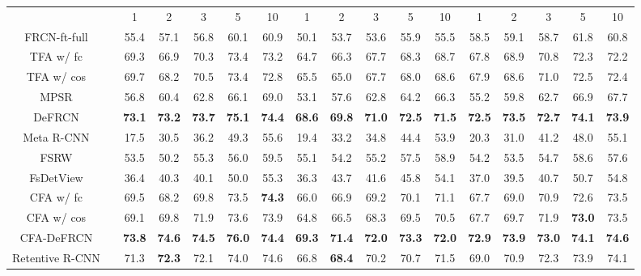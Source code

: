 \documentclass[10pt,twocolumn,letterpaper]{article}
\newcommand{\cmark}{\ding{51}}\newcommand{\xmark}{\ding{55}}\newcommand\minisection[1]{\vspace{1mm}\noindent \textbf{#1}}
\newcommand{\best}[1]{\color{red}\textbf{#1}}
\newcommand{\second}[1]{\color{blue}\textbf{#1}}
\begin{document}
\begin{table*}
\begin{tabular}{c| c | c c c c c | c c c c c | c c c c c}
      & & 1 &  {2} & {3} & {5} &  {10} & 1 &  {2} & {3} & {5} &  {10} & 1 &  {2} & {3} & {5} &  {10} \\ \Xhline{1pt}
      FRCN-ft-full\cite{TFA} &\xmark & 55.4 & 57.1 & 56.8 & 60.1 & 60.9 & 50.1 & 53.7 & 53.6 & 55.9 & 55.5 & 58.5 & 59.1 & 58.7 & 61.8 & 60.8 \\
      TFA w/ fc\cite{TFA}&\xmark & 69.3 & 66.9 & 70.3 & 73.4 & 73.2 & 64.7 & 66.3 & 67.7 & 68.3 & 68.7 & 67.8 & 68.9 & 70.8 & 72.3 & 72.2 \\
      TFA w/ cos\cite{TFA}&\xmark & 69.7 & 68.2 & 70.5 & 73.4 & 72.8 & 65.5 & 65.0 & 67.7 & 68.0 & 68.6 & 67.9 & 68.6 & 71.0 & 72.5 & 72.4 \\
      MPSR\cite{MPSR}&\xmark & 56.8 & 60.4 & 62.8 & 66.1 & 69.0 &
       53.1 & 57.6 & 62.8 & 64.2 & 66.3 & 55.2 & 59.8 & 62.7 & 66.9 & 67.7 \\
      DeFRCN\cite{defrcn}&\xmark & \second{73.1} & \second{73.2} & \second{73.7} & \second{75.1} & \best{74.4} &
      \second{68.6} & \second{69.8} & \second{71.0} & \second{72.5} & \second{71.5} & \second{72.5} & \second{73.5} & \second{72.7} & \best{74.1} & \second{73.9} \\
       Meta R-CNN\cite{MetaRCNN}&\xmark & 17.5 & 30.5 & 36.2 & 49.3 & 55.6 & 19.4 & 33.2 & 34.8 & 44.4 & 53.9 & 20.3 & 31.0 & 41.2 & 48.0 & 55.1 \\
       FSRW\cite{FSRW}&\xmark & 53.5 & 50.2 & 55.3 & 56.0 & 59.5 & 55.1 & 54.2 & 55.2 & 57.5 & 58.9 & 54.2 & 53.5 & 54.7 & 58.6 & 57.6 \\
       FsDetView\cite{FsDetView}&\xmark & 36.4 & 40.3 & 40.1 & 50.0 & 55.3 & 36.3 & 43.7 & 41.6 & 45.8 & 54.1 & 37.0 & 39.5 & 40.7 & 50.7 & 54.8 \\ \Xhline{1pt}
       \rowcolor[HTML]{EFEFEF}
        CFA w/ fc&\xmark & 69.5 & 68.2 & 69.8 & 73.5 & \second{74.3} & 66.0 & 66.9 & 69.2 & 70.1 & 71.1 & 67.7 & 69.0 & 70.9 & 72.6 & 73.5 \\
        \rowcolor[HTML]{EFEFEF}
        CFA w/ cos&\xmark & 69.1 & 69.8 & 71.9 & 73.6 & 73.9 & 64.8 & 66.5 & 68.3 & 69.5 & 70.5 & 67.7 & 69.7 & 71.9 & \second{73.0} & 73.5 \\
       \rowcolor[HTML]{EFEFEF}
        CFA-DeFRCN&\xmark & \best{73.8} & \best{74.6} & \best{74.5} & \best{76.0} & \best{74.4} & \best{69.3} & \best{71.4} & \best{72.0} & \best{73.3} & \best{72.0} & \best{72.9} & \best{73.9} & \best{73.0} & \best{74.1} & \best{74.6} \\ \midrule[1.5pt]
       Retentive R-CNN\cite{gfsod}&\cmark & 71.3 & \second{72.3} & 72.1 & 74.0 & 74.6 & 66.8 & \second{68.4} & 70.2 & 70.7 & 71.5 & 69.0 & 70.9 & 72.3 & 73.9 & 74.1 \\

\end{tabular}
\end{table*}
\end{document}

